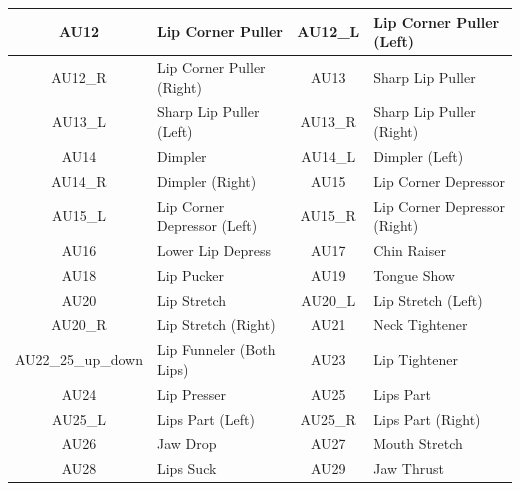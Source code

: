 \documentclass[../../main]{subfiles}
\begin{document}
\begin{table}[h]
\begin{tabular}{|c|l|c|l|}
        AU12             & Lip Corner Puller                       & AU12\_L           & Lip Corner Puller (Left)                  \\ \hline
        AU12\_R          & Lip Corner Puller (Right)               & AU13             & Sharp Lip Puller                          \\ \hline
        AU13\_L          & Sharp Lip Puller (Left)                 & AU13\_R           & Sharp Lip Puller (Right)                  \\ \hline
        AU14             & Dimpler                                 & AU14\_L           & Dimpler (Left)                            \\ \hline
        AU14\_R          & Dimpler (Right)                         & AU15             & Lip Corner Depressor                      \\ \hline
        AU15\_L          & Lip Corner Depressor (Left)             & AU15\_R           & Lip Corner Depressor (Right)              \\ \hline
        AU16             & Lower Lip Depress                       & AU17             & Chin Raiser                               \\ \hline
        AU18             & Lip Pucker                              & AU19             & Tongue Show                               \\ \hline
        AU20             & Lip Stretch                             & AU20\_L           & Lip Stretch (Left)                        \\ \hline
        AU20\_R          & Lip Stretch (Right)                     & AU21             & Neck Tightener                            \\ \hline
        AU22\_25\_up\_down & Lip Funneler (Both Lips) & AU23             & Lip Tightener                             \\ \hline
        AU24             & Lip Presser                             & AU25             & Lips Part                                 \\ \hline
        AU25\_L          & Lips Part (Left)                        & AU25\_R           & Lips Part (Right)                         \\ \hline
        AU26             & Jaw Drop                                & AU27             & Mouth Stretch                             \\ \hline
        AU28             & Lips Suck                               & AU29             & Jaw Thrust                                \\ \hline

\end{tabular}
\end{table}
\end{document}
